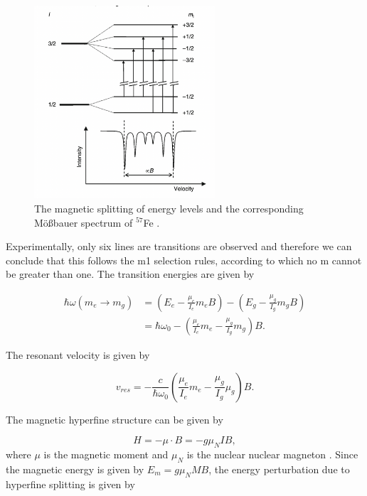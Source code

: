 \documentclass[a4paper]{report}
\numberwithin{equation}{section}
\begin{document}
\begin{figure}[htpb]
    \centering
    \includegraphics[width=0.6\textwidth]{dipole}
    \caption{The magnetic splitting of energy levels and the corresponding M\"o{\ss}bauer spectrum of $^{57}$Fe \cite{Kuzmann2011}.}
    \label{fig:dipole}
\end{figure}

Experimentally, only six lines are transitions are observed and therefore we can conclude that this follows the m1 selection rules, according to which no m cannot be greater than one. The transition energies are given by

\begin{align}
		\hbar \omega (m_{e} \rightarrow m_{g})  &= \left(E_{e} - \frac{\mu_{e}}{I_{e}} m _{e} B \right) - \left( E_{g} - \frac{\mu _{g}}{I_{g}}m _{g} B \right) \\
												&= \hbar \omega _{0} - \left(\frac{\mu _{e}}{I_{e}} m _{e} - \frac{\mu _{g}}{I_{g}}m _{g} \right) B.
\end{align}

The resonant velocity is given by

\begin{equation}
		v_{res} = - \frac{c}{\hbar \omega _{0}} \left(\frac{\mu _{e}}{I_{e}} m _{e} - \frac{\mu _{g}}{I_{g}} \mu _{g} \right) B.
\end{equation}

The magnetic hyperfine structure can be given by

\begin{equation}
		H = - \mu \cdot B = -g \mu _{N} I B,
\end{equation}
where $\mu$ is the magnetic moment and  $\mu _{N}$ is the nuclear nuclear magneton \cite{Kuzmann2011}. Since the magnetic energy is given by $E_{m} = g \mu _{N} M B$, the energy perturbation due to hyperfine splitting is given by 
\end{document}
